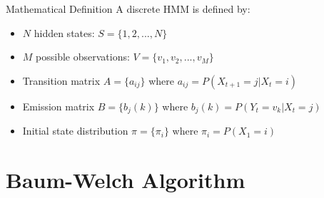 \documentclass{beamer}
\begin{document}
\begin{frame}{Mathematical Definition}
    A discrete HMM is defined by:
    \begin{itemize}
        \item $N$ hidden states: $S = \{1, 2, ..., N\}$
        \item $M$ possible observations: $V = \{v_1, v_2, ..., v_M\}$
        \item Transition matrix $A = \{a_{ij}\}$ where $a_{ij} = P(X_{t+1} = j | X_t = i)$
        \item Emission matrix $B = \{b_j(k)\}$ where $b_j(k) = P(Y_t = v_k | X_t = j)$
        \item Initial state distribution $\pi = \{\pi_i\}$ where $\pi_i = P(X_1 = i)$
    \end{itemize}
\end{frame}
\section{Baum-Welch Algorithm}
\end{document}
